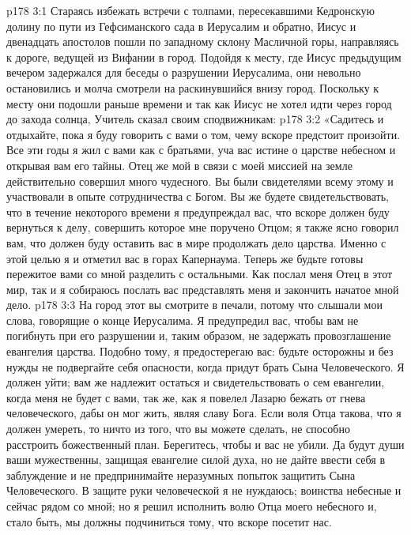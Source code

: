 \vs p178 3:1 Стараясь избежать встречи с толпами, пересекавшими Кедронскую долину по пути из Гефсиманского сада в Иерусалим и обратно, Иисус и двенадцать апостолов пошли по западному склону Масличной горы, направляясь к дороге, ведущей из Вифании в город. Подойдя к месту, где Иисус предыдущим вечером задержался для беседы о разрушении Иерусалима, они невольно остановились и молча смотрели на раскинувшийся внизу город. Поскольку к месту они подошли раньше времени и так как Иисус не хотел идти через город до захода солнца, Учитель сказал своим сподвижникам:
\vs p178 3:2 \pc «Садитесь и отдыхайте, пока я буду говорить с вами о том, чему вскоре предстоит произойти. Все эти годы я жил с вами как с братьями, уча вас истине о царстве небесном и открывая вам его тайны. Отец же мой в связи с моей миссией на земле действительно совершил много чудесного. Вы были свидетелями всему этому и участвовали в опыте сотрудничества с Богом. Вы же будете свидетельствовать, что в течение некоторого времени я предупреждал вас, что вскоре должен буду вернуться к делу, совершить которое мне поручено Отцом; я также ясно говорил вам, что должен буду оставить вас в мире продолжать дело царства. Именно с этой целью я и отметил вас в горах Капернаума. Теперь же будьте готовы пережитое вами со мной разделить с остальными. Как послал меня Отец в этот мир, так и я собираюсь послать вас представлять меня и закончить начатое мной дело.
\vs p178 3:3 На город этот вы смотрите в печали, потому что слышали мои слова, говорящие о конце Иерусалима. Я предупредил вас, чтобы вам не погибнуть при его разрушении и, таким образом, не задержать провозглашение евангелия царства. Подобно тому, я предостерегаю вас: будьте осторожны и без нужды не подвергайте себя опасности, когда придут брать Сына Человеческого. Я должен уйти; вам же надлежит остаться и свидетельствовать о сем евангелии, когда меня не будет с вами, так же, как я повелел Лазарю бежать от гнева человеческого, дабы он мог жить, являя славу Бога. Если воля Отца такова, что я должен умереть, то ничто из того, что вы можете сделать, не способно расстроить божественный план. Берегитесь, чтобы и вас не убили. Да будут души ваши мужественны, защищая евангелие силой духа, но не дайте ввести себя в заблуждение и не предпринимайте неразумных попыток защитить Сына Человеческого. В защите руки человеческой я не нуждаюсь; воинства небесные и сейчас рядом со мной; но я решил исполнить волю Отца моего небесного и, стало быть, мы должны подчиниться тому, что вскоре посетит нас.

